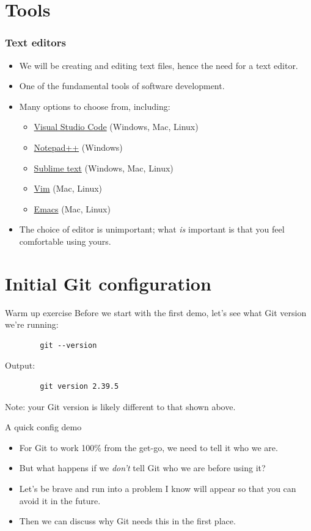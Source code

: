 \section{Tools}

\begin{frame}
\frametitle{Text editors}
\begin{itemize}
    \item We will be creating and editing text files, hence the need for a
        text editor.
    \item One of the fundamental tools of software development.
    \item Many options to choose from, including:
    \begin{itemize}
        \item \href{https://code.visualstudio.com/}{Visual Studio Code} (Windows, Mac, Linux)
        \item \href{https://notepad-plus-plus.org/}{Notepad++} (Windows)
        \item \href{https://www.sublimetext.com/}{Sublime text} (Windows, Mac, Linux)
        \item \href{https://www.vim.org/}{Vim} (Mac, Linux)
        \item \href{https://www.gnu.org/software/emacs/}{Emacs} (Mac, Linux)
    \end{itemize}
    \item The choice of editor is unimportant; what \emph{is} important is
        that you feel comfortable using yours.
\end{itemize}
\end{frame}

\section{Initial Git configuration}

\begin{frame}[fragile]{Warm up exercise}
    Before we start with the first demo, let's see what Git version we're
    running:
    \begin{verbatim}
        git --version
    \end{verbatim}
    Output:
    \begin{verbatim}
        git version 2.39.5
    \end{verbatim}
    Note: your Git version is likely different to that shown above.
\end{frame}

\begin{frame}{A quick config demo}
    \begin{itemize}
        \item For Git to work 100\% from the get-go, we need to tell it who
            we are.
        \item But what happens if we \emph{don't} tell Git who we are before using it?
        \item Let's be brave and run into a problem I know will appear so
            that you can avoid it in the future.
        \item Then we can discuss why Git needs this in the first place.
    \end{itemize}
\end{frame}

